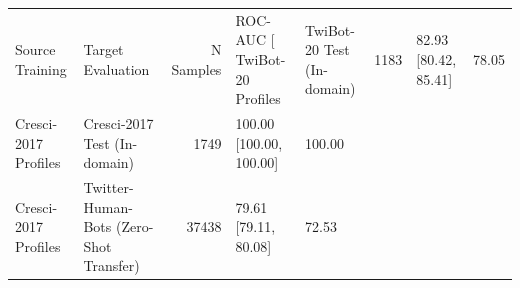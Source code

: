 \begin{tabular}{llrll}
\toprule
Source Training & Target Evaluation & N Samples & ROC-AUC [%
\midrule
TwiBot-20 Profiles & TwiBot-20 Test (In-domain) & 1183 & 82.93 [80.42, 85.41] & 78.05 \\
Cresci-2017 Profiles & Cresci-2017 Test (In-domain) & 1749 & 100.00 [100.00, 100.00] & 100.00 \\
Cresci-2017 Profiles & Twitter-Human-Bots (Zero-Shot Transfer) & 37438 & 79.61 [79.11, 80.08] & 72.53 \\
\bottomrule
\end{tabular}
